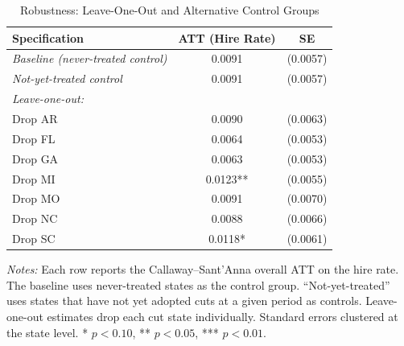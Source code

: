 
\begin{table}[H]
\centering
\caption{Robustness: Leave-One-Out and Alternative Control Groups}
\label{tab:robust}
\begin{threeparttable}
\begin{tabular}{lcc}
\toprule
Specification & ATT (Hire Rate) & SE \\
\midrule
\textit{Baseline (never-treated control)} & 0.0091 & (0.0057) \\[0.3em]
\textit{Not-yet-treated control} & 0.0091 & (0.0057) \\[0.5em]
\textit{Leave-one-out:} & & \\
Drop AR & 0.0090 & (0.0063) \\
Drop FL & 0.0064 & (0.0053) \\
Drop GA & 0.0063 & (0.0053) \\
Drop MI & 0.0123** & (0.0055) \\
Drop MO & 0.0091 & (0.0070) \\
Drop NC & 0.0088 & (0.0066) \\
Drop SC & 0.0118* & (0.0061) \\
\bottomrule
\end{tabular}
\begin{tablenotes}[flushleft]
\small
\item \textit{Notes:} Each row reports the Callaway--Sant'Anna overall ATT on the hire rate. The baseline uses never-treated states as the control group. ``Not-yet-treated'' uses states that have not yet adopted cuts at a given period as controls. Leave-one-out estimates drop each cut state individually. Standard errors clustered at the state level. * $p<0.10$, ** $p<0.05$, *** $p<0.01$.
\end{tablenotes}
\end{threeparttable}
\end{table}
